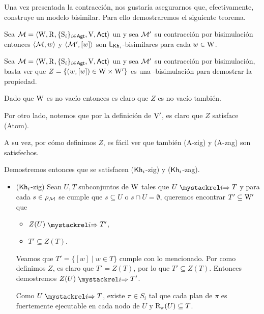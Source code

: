 Una vez presentada la contracción, nos gustaría asegurarnos que, efectivamente, construye un modelo bisimilar. Para ello demostraremos el 
siguiente teorema.

\begin{teorema}
    Sea $\mathcal{M}=\langle \mathrm{W},\mathrm{R},\{ \mathrm{S}_i \}_{i \in {\rm \sf Agt}},\mathrm{V},{\rm \sf Act} \rangle$ un \ults y sea $\mathcal{M}'$ su contracción por bisimulación entonces 
    $\langle \mathcal{M},w \rangle$ y $\langle \mathcal{M}',[w] \rangle$ son $\mathsf{L}_{\mathsf{Kh}_i}$-bisimilares para cada $w \in \mathrm{W}$.
\end{teorema}

\begin{demostracion}
    Sea $\mathcal{M}=\langle \mathrm{W},\mathrm{R},\{ \mathrm{S}_i \}_{i \in {\rm \sf Agt}},\mathrm{V},{\rm \sf Act} \rangle$ un \ults
    y sea $\mathcal{M}'$ su contracción por bisimulación, basta ver que $Z = \{(w,[w]) \in \mathrm{W} \times\mathrm{W}'\}$ es una \KHilogic-bisimulación para demostrar la propiedad.

    Dado que $\mathrm{W}$ es no vacío entonces es claro que $Z$ es no vacío también.

    Por otro lado, notemos que por la definición de $\mathrm{V}'$, es claro que $Z$ satisface (Atom).

    A su vez, por cómo definimos $Z$, es fácil ver que también (A-zig) y (A-zag) son satisfechos.
    
    Demostremos entonces que se satisfacen ($\mathsf{Kh}_i$-zig) y ($\mathsf{Kh}_i$-zag).

    \begin{itemize}
        \item ($\mathsf{Kh}_i$-zig) Sean $U, T$ subconjuntos de $\mathrm{W}$ tales que $U \ultsExecAgi T$ y para cada $s \in \rho_{\mathcal{M}}$ se cumple que 
        $s \subseteq U$ o $s \cap U = \emptyset$, queremos encontrar $T' \subseteq \mathrm{W}'$ que

        \begin{multicols}{2}
            \begin{itemize}
                \item $Z(U) \ultsExecAgi T'$, 
                \item $T' \subseteq Z(T)$.
            \end{itemize}
        \end{multicols}

        Veamos que $T' = \{ [w] \mid w \in T\}$ cumple con lo mencionado. Por como definimos $Z$, es claro que $T'  = Z(T)$, por lo que 
        $T' \subseteq Z(T)$. Entonces demostremos $Z(U) \ultsExecAgi T'$.

        Como $U \ultsExecAgi T$, existe $\pi \in S_i$ tal que cada plan de $\pi$ es fuertemente ejecutable en cada nodo de $U$ y 
        $\mathrm{R}_\pi(U) \subseteq T$. 


\end{itemize}
\end{demostracion}
